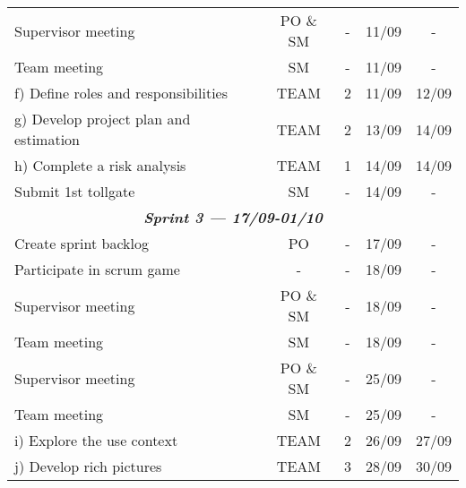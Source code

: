 \begin{longtable}[c]{@{}lcccc@{}}
Supervisor meeting                                       & PO \& SM             & -                 & 11/09          & -            \\
Team meeting                                             & SM                   & -                 & 11/09          & -            \\
f) Define roles and responsibilities                     & TEAM                 & 2                 & 11/09          & 12/09        \\
g) Develop project plan and estimation                   & TEAM                 & 2                 & 13/09          & 14/09        \\
h) Complete a risk analysis                              & TEAM                 & 1                 & 14/09          & 14/09        \\
Submit 1st tollgate                                      & SM                   & -                 & 14/09          & -            \\* \midrule
\multicolumn{5}{c}{\textit{\textbf{Sprint 3 --- 17/09-01/10}}}                                                                         \\
Create sprint backlog                                    & PO                   & -                 & 17/09          & -            \\
Participate in scrum game                                & -                    & -                 & 18/09          & -            \\
Supervisor meeting                                       & PO \& SM             & -                 & 18/09          & -            \\
Team meeting                                             & SM                   & -                 & 18/09          & -            \\
Supervisor meeting                                       & PO \& SM             & -                 & 25/09          & -            \\
Team meeting                                             & SM                   & -                 & 25/09          & -            \\
i) Explore the use context                               & TEAM                 & 2                 & 26/09          & 27/09        \\
j) Develop rich pictures                                 & TEAM                 & 3                 & 28/09          & 30/09        \\

\end{longtable}
